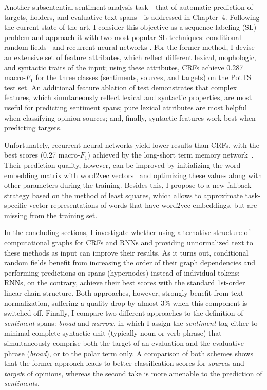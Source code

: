 \documentclass[11pt]{article}
\newcommand{\F}[0]{$F_1$}
\renewcommand{\cite}{\citep}
\begin{document}
Another subsentential sentiment analysis task---that of automatic
prediction of targets, holders, and evaluative text spans---is
addressed in Chapter~4.  Following the current state of the art, I
consider this objective as a sequence-labeling (SL) problem and
approach it with two most popular SL techniques: conditional random
fields~\cite[CRFs; ][]{Lafferty:01} and recurrent neural networks
\cite[RNNs; ][]{Hochreiter:97,Cho:14a}.  For the former method, I
devise an extensive set of feature attributes, which reflect different
lexical, mophologic, and syntactic traits of the input; using these
attributes, CRFs achieve 0.287 macro-\F{} for the three classes
(sentiments, sources, and targets) on the PotTS test set.  An
additional feature ablation of test demonstrates that complex
features, which simutaneously reflect lexical and syntactic
properties, are most useful for predicting sentiment spans; pure
lexical attributes are most helpful when classifying opinion sources;
and, finally, syntactic features work best when predicting targets.

Unfortunately, recurrent neural networks yield lower results than
CRFs, with the best scores (0.27 macro-\F{}) achieved by the
long-short term memory network~\cite{Hochreiter:97}.  Their prediction
quality, however, can be improved by initializing the word embedding
matrix with word2vec vectors~\cite{Mikolov:13} and optimizing these
values along with other parameters during the training.  Besides this,
I propose to a new fallback strategy based on the method of least
squares, which allows to approximate task-specific vector
representations of words that have word2vec embeddings, but are
missing from the training set.

In the concluding sections, I investigate whether using alternative
structure of computational graphs for CRFs and RNNs and providing
unnormalized text to these methods as input can improve their results.
As it turns out, conditional random fields benefit from increasing the
order of their graph dependencies and performing predictions on spans
(hypernodes) instead of individual tokens; RNNs, on the contrary,
achieve their best scores with the standard 1st-order linear-chain
structure.  Both approaches, however, strongly benefit from text
normalization, suffering a quality drop by almost 3\% when this
component is switched off.  Finally, I compare two different
approaches to the definition of \emph{sentiment} spans: \emph{broad}
and \emph{narrow}, in which I assign the \emph{sentiment} tag either
to minimal complete syntactic unit (typically noun or verb phrase)
that simultaneously comprise both the target of an evaluation and the
evaluative phrase (\emph{broad}), or to the polar term only.  A
comparison of both schemes shows that the former approach leads to
better classification scores for \emph{source}s and \emph{target}s of
opinions, whereas the second take is more amenable to the prediction
of \emph{sentiment}s.
\end{document}
